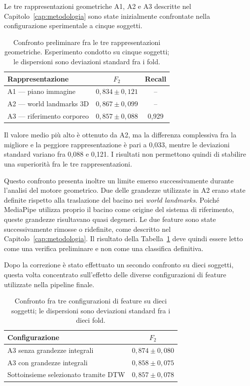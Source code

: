 Le tre rappresentazioni geometriche A1, A2 e A3 descritte nel Capitolo~\ref{cap:metodologia} sono state inizialmente confrontate nella configurazione sperimentale a cinque soggetti.

\begin{table}[ht]
\centering
\caption{Confronto preliminare fra le tre rappresentazioni geometriche.
Esperimento condotto su cinque soggetti; le dispersioni sono deviazioni
standard fra i fold.}
\label{tab:rappresentazioni5}
\begin{tabular}{lcc}
\toprule
\textbf{Rappresentazione} & \textbf{$F_2$} & \textbf{Recall} \\
\midrule
A1 --- piano immagine & $0{,}834 \pm 0{,}121$ & -- \\
A2 --- world landmarks 3D & $0{,}867 \pm 0{,}099$ & -- \\
A3 --- riferimento corporeo & $0{,}857 \pm 0{,}088$ & 0,929 \\
\bottomrule
\end{tabular}
\end{table}

Il valore medio più alto è ottenuto da A2, ma la differenza complessiva fra la migliore e la peggiore rappresentazione è pari a 0,033, mentre le deviazioni standard variano fra 0,088 e 0,121. I risultati non permettono quindi di stabilire una superiorità fra le tre rappresentazioni.

Questo confronto presenta inoltre un limite emerso successivamente durante l'analisi del motore geometrico. Due delle grandezze utilizzate in A2 erano state definite rispetto alla traslazione del bacino nei \emph{world landmarks}. Poiché MediaPipe utilizza proprio il bacino come origine del sistema di riferimento, queste grandezze risultavano quasi degeneri. Le due feature sono state successivamente rimosse o ridefinite, come descritto nel Capitolo~\ref{cap:metodologia}. Il risultato della Tabella~\ref{tab:rappresentazioni5} deve quindi essere letto come una verifica preliminare e non come una classifica definitiva.

Dopo la correzione è stato effettuato un secondo confronto su dieci soggetti, questa volta concentrato sull'effetto delle diverse configurazioni di feature utilizzate nella pipeline finale.

\begin{table}[ht]
\centering
\caption{Confronto fra tre configurazioni di feature su dieci soggetti; le
dispersioni sono deviazioni standard fra i dieci fold.}
\label{tab:rappresentazioni10}
\begin{tabular}{lc}
\toprule
\textbf{Configurazione} & \textbf{$F_2$} \\
\midrule
A3 senza grandezze integrali & $0{,}874 \pm 0{,}080$ \\
A3 con grandezze integrali & $0{,}858 \pm 0{,}075$ \\
Sottoinsieme selezionato tramite DTW & $0{,}857 \pm 0{,}078$ \\
\bottomrule
\end{tabular}
\end{table}

